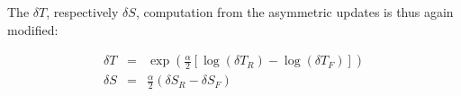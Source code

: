 \documentclass[a4paper]{article}
\begin{document}
The $\delta T$, respectively $\delta S$, computation from the asymmetric updates is thus again modified:

\begin{eqnarray}
	\delta T & = & \exp\left(\frac{\alpha}{2} \left[ \log(\delta T_R) - \log(\delta T_F)\right] \right) \\
	\delta S & = & \frac{\alpha}{2} \left(\delta S_R - \delta S_F\right)
\end{eqnarray}

\newpage 



\end{document}
